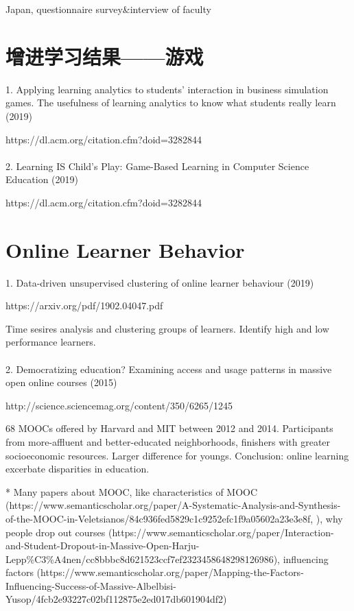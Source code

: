 \documentclass[onecolumn,aps,prd,groupedaddress,nofootinbib,notitlepage,12pt]{revtex4-1}
\begin{document}
Japan, questionnaire survey\&interview of  faculty

\section{增进学习结果——游戏}
1. Applying learning analytics to students’ interaction in business simulation games. The usefulness of learning analytics to know what students really learn (2019)

https://dl.acm.org/citation.cfm?doid=3282844
\\\\
2. Learning IS Child's Play: Game-Based Learning in Computer Science Education (2019)

https://dl.acm.org/citation.cfm?doid=3282844


\section{Online Learner Behavior}
1. Data-driven unsupervised clustering of online learner behaviour (2019)

https://arxiv.org/pdf/1902.04047.pdf

Time sesires analysis and clustering groups of learners. 
Identify high and low performance learners.
\\\\
2. Democratizing education? Examining access and usage patterns in massive open online courses (2015)

http://science.sciencemag.org/content/350/6265/1245

68 MOOCs offered by Harvard and MIT between 2012 and 2014.
Participants from more-affluent and better-educated neighborhoods, finishers with greater socioeconomic resources.
Larger difference for youngs.
Conclusion: online learning excerbate disparities in education.

* Many papers about MOOC, like characteristics of MOOC (https://www.semanticscholar.org/paper/A-Systematic-Analysis-and-Synthesis-of-the-MOOC-in-Veletsianos/84c936fed5829c1c9252efc1f9a05602a23e3e8f, ), why people drop out courses (https://www.semanticscholar.org/paper/Interaction-and-Student-Dropout-in-Massive-Open-Harju-Lepp\%C3\%A4nen/cc8bbbc8d621523ccf7ef2323458648298126986), influencing factors (https://www.semanticscholar.org/paper/Mapping-the-Factors-Influencing-Success-of-Massive-Albelbisi-Yusop/4fcb2e93227c02bf112875e2ed017db601904df2)
\end{document}
